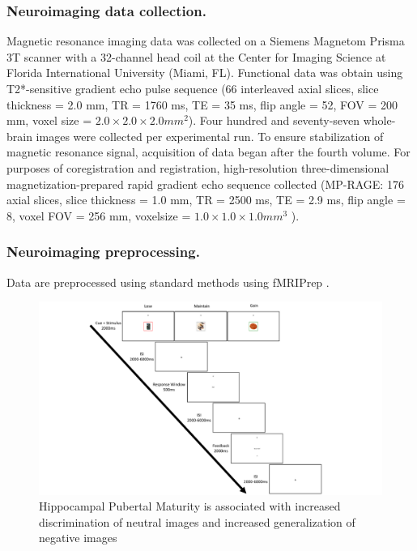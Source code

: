 \documentclass[11pt]{article}
\providecommand\citep{\cite}
\begin{document}
\subsubsection*{Neuroimaging data collection.}
Magnetic resonance imaging data was collected on a Siemens Magnetom Prisma 3T scanner
with a 32-channel head coil at the Center for Imaging Science at Florida International
University (Miami, FL). Functional data was obtain using T2*-sensitive gradient echo pulse 
sequence (66 interleaved axial slices, slice thickness = 2.0 mm, TR = 1760 ms, TE = 35 ms, flip angle = 
52\textdegree, FOV = 200 mm, voxel size = $2.0 \times 2.0 \times 2.0 mm^2$). Four hundred and seventy-seven whole-brain images 
were collected per experimental run. To ensure stabilization of magnetic resonance signal, acquisition of 
data began after the fourth volume. For purposes of coregistration and registration, high-resolution three-dimensional magnetization-prepared rapid gradient echo sequence collected (MP-RAGE: 176 axial slices, 
slice thickness = 1.0 mm, TR = 2500 ms, TE = 2.9 ms, flip angle = 8\textdegree, voxel FOV = 256 mm, voxelsize = $1.0 \times 
1.0 \times 1.0 mm^3$
).
\subsubsection*{Neuroimaging preprocessing.}
Data are preprocessed using standard methods using fMRIPrep \citep{Esteban_Markiewicz_Goncalves_Provins_Kent_DuPre_Salo_Ciric_Pinsard_Blair_et_al._2022}.
\begin{figure}%
    \includegraphics[width=14cm]{figures/aim_2_task.pdf}%
    \caption{Hippocampal Pubertal Maturity is associated with increased discrimination
        of neutral images and increased generalization of negative images}%
    \label{fig:2}%
\end{figure}
\end{document}
